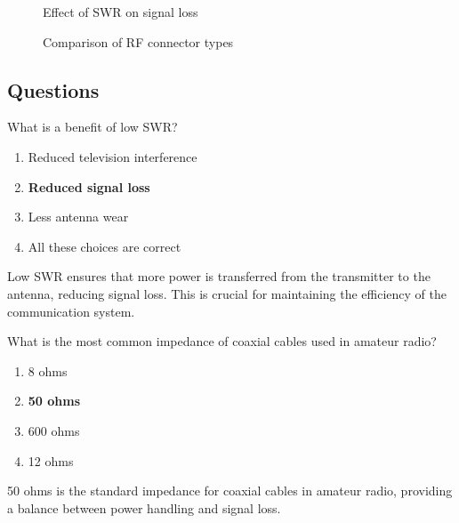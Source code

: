 \begin{figure}[h]
    \centering
    \caption{Effect of SWR on signal loss}
    \label{fig:swr_loss}
\end{figure}

\begin{figure}[h]
    \centering
    \caption{Comparison of RF connector types}
    \label{fig:rf_connectors}
\end{figure}

\subsection*{Questions}
\begin{tcolorbox}[colback=gray!10!white,colframe=black!75!black,title={T9B01}]
    What is a benefit of low SWR?
    \begin{enumerate}[label=\Alph*),noitemsep]
        \item Reduced television interference
        \item \textbf{Reduced signal loss}
        \item Less antenna wear
        \item All these choices are correct
    \end{enumerate}
\end{tcolorbox}
Low SWR ensures that more power is transferred from the transmitter to the antenna, reducing signal loss. This is crucial for maintaining the efficiency of the communication system.


\begin{tcolorbox}[colback=gray!10!white,colframe=black!75!black,title={T9B02}]
    What is the most common impedance of coaxial cables used in amateur radio?
    \begin{enumerate}[label=\Alph*),noitemsep]
        \item 8 ohms
        \item \textbf{50 ohms}
        \item 600 ohms
        \item 12 ohms
    \end{enumerate}
\end{tcolorbox}
50 ohms is the standard impedance for coaxial cables in amateur radio, providing a balance between power handling and signal loss.

